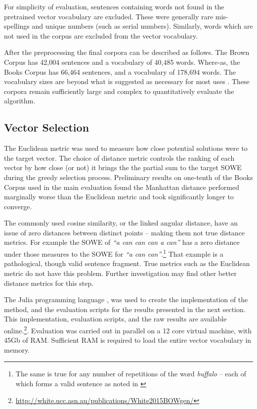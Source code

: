 \documentclass{llncs}
\begin{document}
For simplicity of evaluation, sentences containing words not found in the pretrained vector vocabulary are excluded. These were generally rare mis-spellings and unique numbers (such as serial numbers). Similarly, words which are not used in the corpus are excluded from the vector vocabulary. 

After the preprocessing the final corpora can be described as follows. The Brown Corpus has 42,004 sentences and a vocabulary of 40,485 words. Where-as, the Books Corpus has 66,464 sentences, and a vocabulary of 178,694 words. The vocabulary sizes are beyond what is suggested as necessary for most uses \parencite{nation2006large}. These corpora remain sufficiently large and complex to quantitatively evaluate the algorithm.

\subsection{Vector Selection}
The Euclidean metric was used to measure how close potential solutions were to the target vector. The choice of distance metric controls the ranking of each vector by how close (or not) it brings the the partial sum  to the target SOWE during the greedy selection process. Preliminary results on one-tenth of the Books Corpus used in the main evaluation found the Manhattan distance performed marginally worse than the Euclidean metric and took significantly longer to converge.

The commonly used cosine similarity, or the linked angular distance, have an issue of zero distances between distinct points -- making them not true distance metrics. For example the SOWE of \emph{``a can can can a can''} has a zero distance under those measures to the SOWE for \emph{``a can can''}.\footnote{The same is true for any number of repetitions of the word \emph{buffalo} -- each of which forms a valid sentence as noted in \textcite{tymoczko1995sweet}} That example is a pathological, though valid sentence fragment. True metrics such as the Euclidean metric do not have this problem. Further investigation may find other better distance metrics for this step. 


The Julia programming language \parencite{Julia}, was used to create the implementation of the method, and the evaluation scripts for the results presented in the next section. This implementation, evaluation scripts, and the raw results are available online.\footnote{\url{http://white.ucc.asn.au/publications/White2015BOWgen/}}. Evaluation was carried out in parallel on a 12 core virtual machine, with 45Gb of RAM. Sufficient RAM is required to load the entire vector vocabulary in memory.
\end{document}
